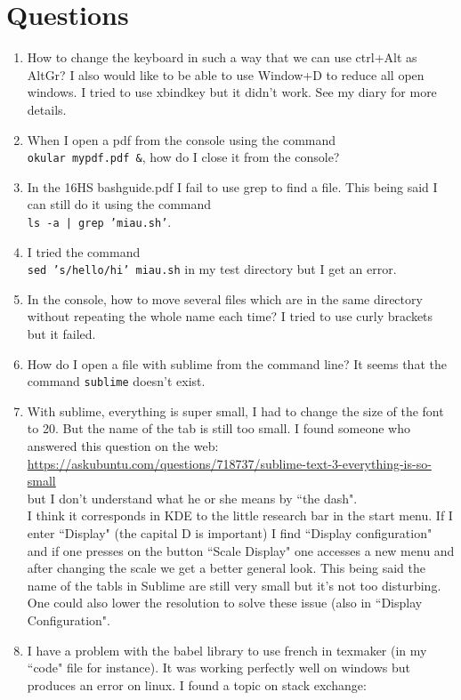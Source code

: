 \documentclass[11pt,a4paper]{article} %
\begin{document}
\section{Questions}
\begin{enumerate}
\item How to change the keyboard in such a way that we can use ctrl+Alt as AltGr? I also would like to be able to use Window+D to reduce all open windows. I tried to use xbindkey but it didn't work. See my diary for more details.
\item When I open a pdf from the console using the command\\
\texttt{okular mypdf.pdf \&}, how do I close it from the console?
\item In the 16HS bashguide.pdf I fail to use grep to find a file. This being said I can still do it using the command \\
\texttt{ls -a | grep 'miau.sh'}.
\item I tried the command\\
\texttt{sed 's/hello/hi' miau.sh} in my test directory but I get an error.
\item In the console, how to move several files which are in the same directory without repeating the whole name each time? I tried to use curly brackets but it failed.
\item How do I open a file with sublime from the command line? It seems that the command \texttt{sublime} doesn't exist.
\item With sublime, everything is super small, I had to change the size of the font to 20. But the name of the tab is still too small. I found someone who answered this question on the web:\\
\url{https://askubuntu.com/questions/718737/sublime-text-3-everything-is-so-small}\\
but I don't understand what he or she means by ``the dash".\\
I think it corresponds in KDE to the little research bar in the start menu. If I enter ``Display" (the capital D is important) I find ``Display configuration" and if one presses on the button ``Scale Display" one accesses a new menu and after changing the scale we get a better general look. This being said the name of the tabls in Sublime are still very small but it's not too disturbing. One could also lower the resolution to solve these issue (also in ``Display Configuration".\\
\item I have a problem with the babel library to use french in texmaker (in my ``code" file for instance). It was working perfectly well on windows but produces an error on linux. I found a topic on stack exchange:\\

\end{enumerate}
\end{document}
